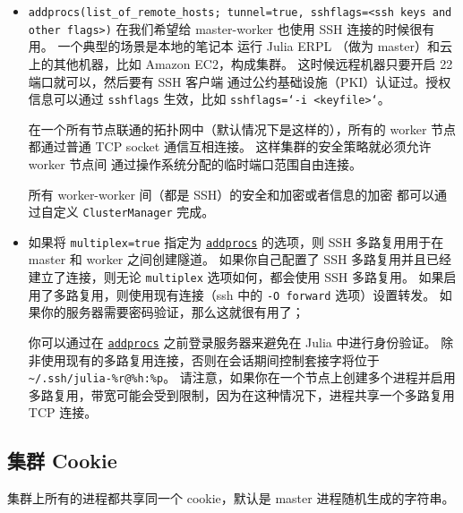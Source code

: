 \begin{itemize}
\item \texttt{addprocs(list\_of\_remote\_hosts; tunnel=true, sshflags=<ssh keys and other flags>)} 在我们希望给 master-worker 也使用 SSH 连接的时候很有用。 一个典型的场景是本地的笔记本 运行 Julia ERPL （做为 master）和云上的其他机器，比如 Amazon EC2，构成集群。 这时候远程机器只要开启 22 端口就可以，然后要有 SSH 客户端 通过公约基础设施（PKI）认证过。授权信息可以通过 \texttt{sshflags} 生效，比如 \texttt{sshflags=`-i <keyfile>`}。

在一个所有节点联通的拓扑网中（默认情况下是这样的），所有的 worker 节点都通过普通 TCP socket 通信互相连接。 这样集群的安全策略就必须允许 worker 节点间 通过操作系统分配的临时端口范围自由连接。

所有 worker-worker 间（都是 SSH）的安全和加密或者信息的加密 都可以通过自定义 \texttt{ClusterManager} 完成。


\item 如果将 \texttt{multiplex=true} 指定为 \hyperlink{2657399037748470653}{\texttt{addprocs}} 的选项，则 SSH 多路复用用于在 master 和 worker 之间创建隧道。 如果你自己配置了 SSH 多路复用并且已经建立了连接，则无论 \texttt{multiplex} 选项如何，都会使用 SSH 多路复用。 如果启用了多路复用，则使用现有连接（ssh 中的 \texttt{-O forward} 选项）设置转发。 如果你的服务器需要密码验证，那么这就很有用了；

你可以通过在 \hyperlink{2657399037748470653}{\texttt{addprocs}} 之前登录服务器来避免在 Julia 中进行身份验证。 除非使用现有的多路复用连接，否则在会话期间控制套接字将位于 \texttt{{\textasciitilde}/.ssh/julia-\%r@\%h:\%p}。 请注意，如果你在一个节点上创建多个进程并启用多路复用，带宽可能会受到限制，因为在这种情况下，进程共享一个多路复用 TCP 连接。

\end{itemize}


\hypertarget{2147150475887832470}{}


\subsection{集群 Cookie}



集群上所有的进程都共享同一个 cookie，默认是 master 进程随机生成的字符串。



